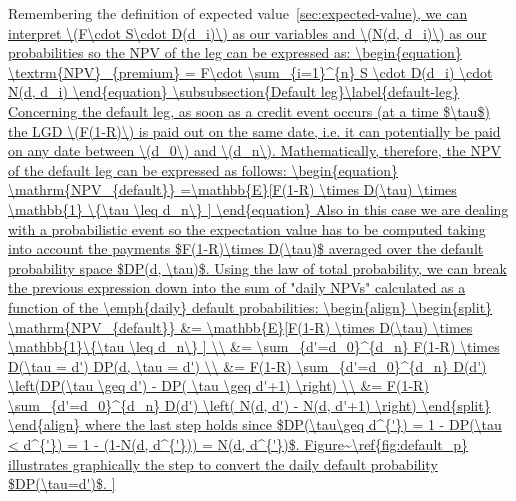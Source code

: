 Remembering the definition of expected value~\ref{sec:expected-value), we can interpret 
\(F\cdot S\cdot D(d_i)\) as our variables and \(N(d, d_i)\) as our probabilities so the NPV of the
leg can be expressed as:

\begin{equation}
	\textrm{NPV}_{premium} = F\cdot \sum_{i=1}^{n} S \cdot D(d_i) \cdot N(d, d_i)
\end{equation}

\subsubsection{Default leg}\label{default-leg}

Concerning the default leg, as soon as a credit event occurs (at a time $\tau$) the LGD \(F(1-R)\) is paid out on the same date, i.e. it can potentially be paid on any date between \(d_0\) and \(d_n\). Mathematically, therefore, the NPV of the default leg can be expressed as follows:

\begin{equation}
\mathrm{NPV_{default}} =\mathbb{E}[F(1-R) \times D(\tau) \times \mathbb{1} \{\tau \leq d_n\} ]
\end{equation}

Also in this case we are dealing with a probabilistic event so the expectation value has to be computed taking into account the payments $F(1-R)\times D(\tau)$ averaged over the default probability space $DP(d, \tau)$. 

Using the law of total probability, we can break the previous expression down into the sum
of "daily NPVs" calculated as a function of the \emph{daily} default
probabilities:

\begin{align}
\begin{split}
\mathrm{NPV_{default}} &= \mathbb{E}[F(1-R) \times D(\tau) \times \mathbb{1}\{\tau \leq d_n\} ] \\
&= \sum_{d'=d_0}^{d_n} F(1-R) \times D(\tau = d') DP(d, \tau = d') \\
&= F(1-R) \sum_{d'=d_0}^{d_n} D(d') \left(DP(\tau \geq d') - DP( \tau \geq d'+1) \right) \\
&= F(1-R) \sum_{d'=d_0}^{d_n} D(d') \left( N(d, d') - N(d, d'+1) \right)
\end{split}
\end{align}
where the last step holds since $DP(\tau\geq d^{'}) = 1 - DP(\tau < d^{'}) = 1 - (1-N(d, d^{'})) = N(d, d^{'})$. 
Figure~\ref{fig:default_p} illustrates graphically the step to convert the daily default probability $DP(\tau=d')$.

}

